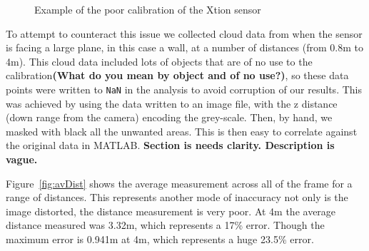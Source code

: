 \documentclass[]{article}
\begin{document}
{\begin{figure}[H]
\centering     %
{} \;
\caption{Example of the poor calibration of the Xtion sensor}
\label{fig:uncal5m}
\end{figure}


To attempt to counteract this issue we collected cloud data from when the sensor is facing a large plane, in this case a wall, at a number of distances (from 0.8m to 4m). This cloud data included lots of objects that are of no use to the calibration\textbf{(What do you mean by object and of no use?)}, so these data points were written to \verb"NaN" in the analysis to avoid corruption of our results. This was achieved by using the data written to an image file, with the z distance (down range from the camera) encoding the grey-scale. Then, by hand, we masked with black all the unwanted areas. This is then easy to correlate against the original data in MATLAB. \textbf{Section is needs clarity. Description is vague.}

Figure~\ref{fig:avDist} shows the average measurement across all of the frame for a range of distances. This represents another mode of inaccuracy not only is the image distorted, the distance measurement is very poor. At 4m the average distance measured was 3.32m, which represents a 17\% error. Though the maximum error is 0.941m at 4m, which represents a huge 23.5\% error. 

}
\end{document}
